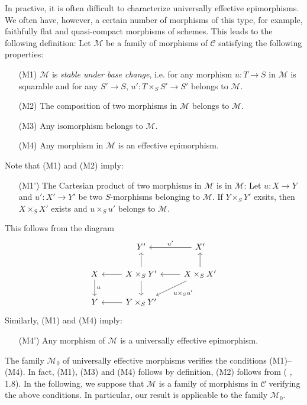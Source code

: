 In practive, it is often difficult to characterize universally effective epimorphisms. We often have, however, a certain number of morphisms of this type, for example, faithfully flat and quasi-compact morphisms of schemes. This leads to the following definition: Let $\mathcal{M}$ be a family of morphisms of $\mathcal{C}$ satisfying the following properties:
\begin{enumerate}[leftmargin=40pt]
    \item[(M1)] $\mathcal{M}$ is \textit{stable under base change}, i.e. for any morphism $u:T\to S$ in $\mathcal{M}$ is squarable and for any $S'\to S$, $u':T\times_SS'\to S'$ belongs to $\mathcal{M}$. 
    \item[(M2)] The composition of two morphisms in $\mathcal{M}$ belongs to $\mathcal{M}$.
    \item[(M3)] Any isomorphism belongs to $\mathcal{M}$.
    \item[(M4)] Any morphism in $\mathcal{M}$ is an effective epimorphism.  
\end{enumerate}
Note that (M1) and (M2) imply:
\begin{enumerate}[leftmargin=40pt]
    \item[(M1')] The Cartesian product of two morphisms in $\mathcal{M}$ is in $\mathcal{M}$: Let $u:X\to Y$ and $u':X'\to Y'$ be two $S$-morphisms belonging to $\mathcal{M}$. If $Y\times_SY'$ exsits, then $X\times_SX'$ exists and $u\times_Su'$ belongs to $\mathcal{M}$.
\end{enumerate}
This follows from the diagram
\[\begin{tikzcd}
&Y'&X'\ar[l,swap,"u'"]\\
X\ar[d,"u"]&X\times_SY'\ar[l]\ar[d]\ar[u]&X\times_SX'\ar[ld,"u\times_Su'"]\ar[l]\ar[u]\\
Y&Y\times_SY'\ar[l] 
\end{tikzcd}\]
Similarly, (M1) and (M4) imply:
\begin{enumerate}[leftmargin=40pt]
    \item[(M4')] Any morphism of $\mathcal{M}$ is a universally effective epimorphism.
\end{enumerate}

The family $\mathcal{M}_0$ of universally effective morphisms verifies the conditions (M1)--(M4). In fact, (M1), (M3) and (M4) follows by definition, (M2) follows from (\cite{SGA3-1} , 1.8). In the following, we suppose that $\mathcal{M}$ is a family of morphisms in $\mathcal{C}$ verifying the above conditions. In particular, our result is applicable to the family $\mathcal{M}_0$.

